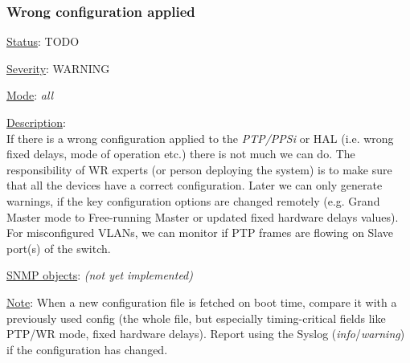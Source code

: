 \subsubsection{\bf Wrong configuration applied}
		\label{fail:timing:wrong_config}
		\begin{pck_descr}
			\item [] \underline{Status}: TODO
			\item [] \underline{Severity}: WARNING
			\item [] \underline{Mode}: \emph{all}
			\item [] \underline{Description}:\\
				If there is a wrong configuration applied to the \emph{PTP/PPSi} or HAL
				(i.e.  wrong fixed delays, mode of operation etc.) there is not much we
				can do. The responsibility of WR experts (or person deploying the
				system) is to make sure that all the devices have a correct
				configuration. Later we can only generate warnings, if the key
				configuration options are changed remotely (e.g. Grand Master mode to
				Free-running Master or updated fixed hardware delays values).\\
				For misconfigured VLANs, we can monitor if PTP frames are flowing on
				Slave port(s) of the switch.
			\item [] \underline{SNMP objects}: \emph{(not yet implemented)}
			\item [] \underline{Note}: When a new configuration file is fetched on
				boot time, compare it with a previously used config (the whole file,
				but especially timing-critical fields like PTP/WR mode, fixed hardware
				delays). Report using the Syslog (\emph{info}/\emph{warning}) if the
				configuration has changed.
		\end{pck_descr}

